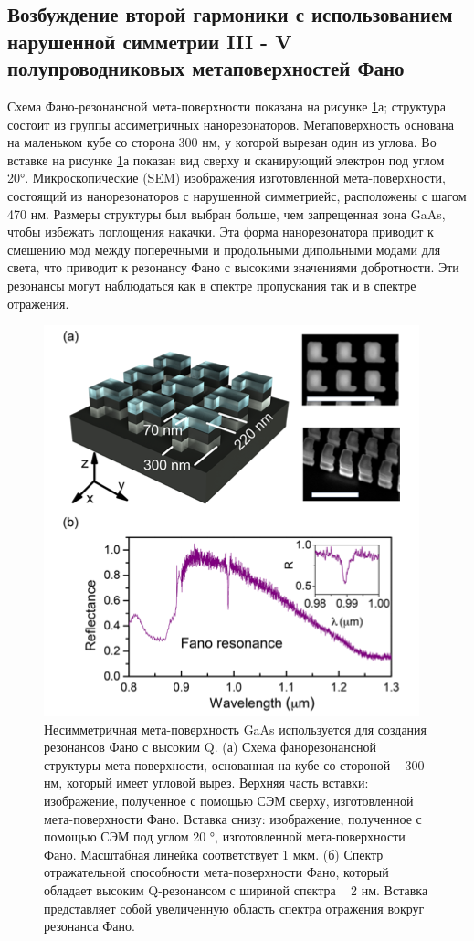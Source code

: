 \subsection*{Возбуждение второй гармоники с использованием нарушенной симметрии III - V полупроводниковых метаповерхностей Фано}
\hspace*{2mm}
Схема Фано-резонансной мета-поверхности показана на рисунке  \ref{nonliner:matasurf}а; структура состоит из группы ассиметричных  нанорезонаторов. Метаповерхность основана на маленьком кубе со сторона 300 нм, у которой вырезан один из углова. Во вставке на рисунке  \ref{nonliner:matasurf}а показан вид сверху и сканирующий электрон под углом 20°. Микроскопические (SEM) изображения изготовленной мета-поверхности, состоящий из нанорезонаторов с нарушенной симметриейс, расположены с шагом 470 нм. Размеры структуры был выбран больше, чем запрещенная зона GaAs, чтобы избежать поглощения накачки. Эта форма нанорезонатора приводит к смешению мод между поперечными и продольными дипольными модами для света, что приводит к резонансу Фано с высокими значениями добротности. Эти резонансы могут наблюдаться как в спектре  пропускания так и в спектре отражения.
 \begin{figure}
	\centering
	\includegraphics[width=0.5\linewidth]{images/fig6.png}
	\caption{Несимметричная мета-поверхность GaAs используется для создания резонансов Фано с высоким Q. (а) Схема фанорезонансной структуры мета-поверхности, основанная на кубе со стороной ~ 300 нм, который имеет угловой вырез. Верхняя часть вставки: изображение, полученное с помощью СЭМ сверху, изготовленной мета-поверхности Фано. Вставка снизу: изображение, полученное с помощью СЭМ под углом 20 °, изготовленной мета-поверхности Фано. Масштабная линейка соответствует 1 мкм. (б) Спектр отражательной способности мета-поверхности Фано, который обладает высоким Q-резонансом с шириной спектра ~ 2 нм. Вставка представляет собой увеличенную область спектра отражения вокруг резонанса Фано. }
	\label{nonliner:matasurf}
\end{figure}
